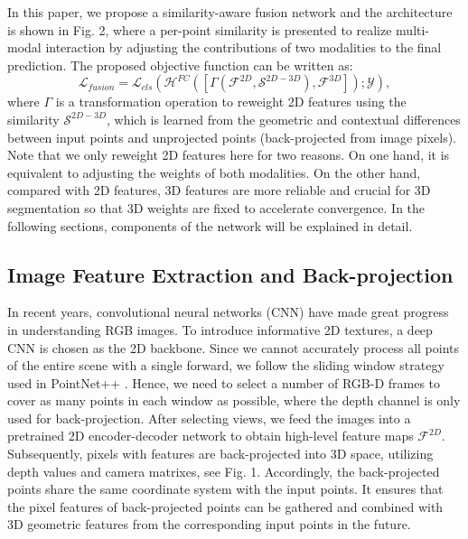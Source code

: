 \documentclass[letterpaper, 10 pt, conference]{ieeeconf}
\begin{document}
In this paper, we propose a similarity-aware fusion network and the architecture is shown in Fig. 2, where a per-point similarity is presented to realize multi-modal interaction by adjusting the contributions of two modalities to the final prediction. The proposed objective function can be written as:
\begin{equation}
\mathcal{L}_{fusion} = \mathcal{L}_{cls}(\mathcal{H}^{FC}([\Gamma(\mathcal{F}^{2D},\mathcal{S}^{2D-3D}),\mathcal{F}^{3D}]);\mathcal{Y}),
\end{equation}
where $\Gamma$ is a transformation operation to reweight 2D features using the similarity $\mathcal{S}^{2D-3D}$, which is learned from the geometric and contextual differences between input points and unprojected points (back-projected from image pixels). Note that we only reweight 2D features here for two reasons. On one hand, it is equivalent to adjusting the weights of both modalities. On the other hand, compared with 2D features, 3D features are more reliable and crucial for 3D segmentation so that 3D weights are fixed to accelerate convergence.
In the following sections, components of the network will be explained in detail.




\subsection{Image Feature Extraction and Back-projection}

In recent years, convolutional neural networks (CNN) have made great progress in understanding RGB images. To introduce informative 2D textures, a deep CNN is chosen as the 2D backbone. Since we cannot accurately process all points of the entire scene with a single forward, we follow the sliding window strategy used in PointNet++ \cite{qi2017pointnet++}. Hence, we need to select a number of RGB-D frames to cover as many points in each window as possible, where the depth channel is only used for back-projection. After selecting views, we feed the images into a pretrained 2D encoder-decoder network to obtain high-level feature maps $\mathcal{F}^{2D}$. Subsequently, pixels with features are back-projected into 3D space, utilizing depth values and camera matrixes, see Fig. 1. Accordingly, the back-projected points share the same coordinate system with the input points. It ensures that the pixel features of back-projected points can be gathered and combined with 3D geometric features from the corresponding input points in the future. 
\end{document}
